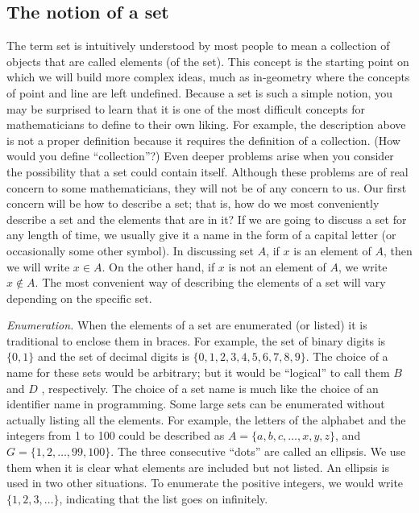 \documentclass[10pt,]{book}
\theoremstyle{plain}
\theoremstyle{definition}
\theoremstyle{definition}
\theoremstyle{definition}
\theoremstyle{definition}
\numberwithin{equation}{section}
\begin{document}
\subsection[The notion of a set]{The notion of a set}\label{subsection-1}
The term set is intuitively understood by most people to mean a collection of objects that are called elements (of the set). This concept is the
starting point on which we will build more complex ideas, much as in-geometry where the concepts of point and line are left undefined. 
Because a set is such a simple notion, you may be surprised to learn that it is one of the most difficult concepts for mathematicians to define to
their own liking. For example, the description above is not a proper definition because it requires the definition of a collection. (How would you
define ``collection''?) Even deeper problems arise when you consider the possibility that a set could contain itself. Although these problems
are of real concern to some mathematicians, they will not be of any concern to us. 
Our first concern will be how to describe a set; that is, how do we most conveniently describe a set and the elements that are in it? If we are going to discuss a set for any length of time, we usually give it a name in the form of a capital letter (or occasionally some other symbol). In discussing set \( A\), if \( x\) is an element of \( A\), then we will write \(x \in  A\).\label{notation-1}
 On the other hand, if \( x\) is not an element
of \( A\), we write \(x \notin  A\).\label{notation-2}
 The most convenient way of describing the elements of a set will vary depending on the specific set. %
\par
\emph{ Enumeration.} When the elements of a set are enumerated (or listed) it is traditional to enclose them in braces. For example, the
set of binary digits is\(\{0, 1\}\) and the set of decimal digits is \(\{0, 1, 2, 3, 4, 5, 6, 7, 8, 9\}\). The choice of a name for these sets would
be arbitrary; but it would be ``logical'' to call them \( B\) and \( D\) , respectively. The choice of a set name is much like the
choice of an identifier name in programming. Some large sets can be enumerated without actually listing all the elements. For example, the letters
of the alphabet and the integers from 1 to 100 could be described as 
\(A = \{a, b, c,\ldots , x, y, z\}\), and \(G = \{1, 2, \ldots  , 99, 100\}\). 
The three consecutive ``dots'' are called an ellipsis. We use them when it is clear what elements are included but not listed. An ellipsis is
used in two other situations. To enumerate the positive integers, we would write \(\{1, 2, 3,\ldots  \}\), indicating that the list goes on infinitely.
\end{document}
